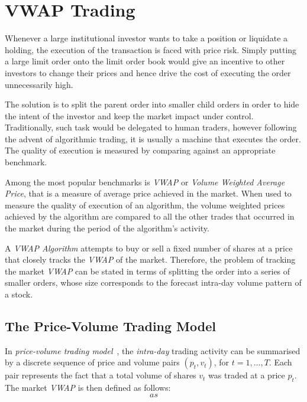\section{VWAP Trading}
Whenever a large institutional investor wants to take a position or liquidate a holding, the execution of the transaction is faced with price risk. Simply putting a large limit order onto the limit order book would give an incentive to other investors to change their prices and hence drive the cost of executing the order unnecessarily high. 

The solution is to split the parent order into smaller child orders in order to hide the intent of the investor and keep the market impact under control. Traditionally, such task would be delegated to human traders, however following the advent of algorithmic trading, it is usually a machine that executes the order. The quality of execution is measured by comparing against an appropriate benchmark.

Among the most popular benchmarks is \textit{VWAP} or \textit{Volume Weighted Average Price}, that is a measure of average price achieved in the market. When used to measure the quality of execution of an algorithm, the volume weighted prices achieved by the algorithm are compared to all the  other trades that occurred in the market during the period of the algorithm's activity. 

A \textit{VWAP Algorithm} attempts to buy or sell a fixed number of shares at a price that closely tracks the \textit{VWAP} of the market. Therefore, the problem of tracking the market \textit{VWAP} can be stated in terms of splitting the order into a series of smaller orders, whose size corresponds to the forecast intra-day volume pattern of a stock. 

\subsection{The Price-Volume Trading Model}
In \textit{price-volume trading model}~\cite{Kakade2004}, the \textit{intra-day} trading activity can be summarised by a discrete sequence of price and volume pairs $(p_t, v_t)$, for $t=1,\ldots,T$. Each pair represents the fact that a total volume of shares $v_t$ was traded at a price $p_t$. The market \textit{VWAP} is then defined as follows:
\begin{equation}  
\label{Equation/Market-Vwap}
as
\end{equation}


